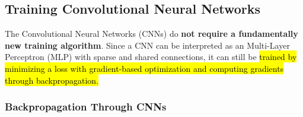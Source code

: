 \subsection{Training Convolutional Neural Networks}\label{sec:training-convolutional-neural-networks}

The Convolutional Neural Networks (CNNs) do \textbf{not require a fundamentally new training algorithm}. Since a CNN can be interpreted as an Multi-Layer Perceptron (MLP) with sparse and shared connections, it can still be \hl{trained by minimizing a loss with gradient-based optimization and computing gradients through backpropagation.}

\longline

\subsubsection{Backpropagation Through CNNs}

